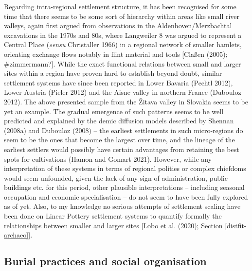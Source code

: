 \documentclass[
  12pt,
  a4paper, twoside]{book}
\begin{document}
Regarding intra-regional settlement structure, it has been recognised for some time that there seems to be some sort of hierarchy within areas like small river valleys, again first argued from observations in the Aldenhoven/Merzbachtal excavations in the 1970s and 80s, where Langweiler 8 was argued to represent a Central Place (\emph{sensu} Christaller 1966) in a regional network of smaller hamlets, orienting exchange flows notably in flint material and tools {[}Claßen (2005); \#zimmermann?{]}. While the exact functional relations between small and larger sites within a region have proven hard to establish beyond doubt, similar settlement systems have since been reported in Lower Bavaria (Pechtl 2012), Lower Austria (Pieler 2012) and the Aisne valley in northern France (Dubouloz 2012). The above presented sample from the Žitava valley in Slovakia seems to be yet an example. The gradual emergence of such patterns seems to be well predicted and explained by the demic diffusion models described by Shennan (2008a) and Dubouloz (2008) -- the earliest settlements in such micro-regions do seem to be the ones that become the largest over time, and the lineage of the earliest settlers would possibly have certain advantages from retaining the best spots for cultivations (Hamon and Gomart 2021). However, while any interpretation of these systems in terms of regional polities or complex chiefdoms would seem unfounded, given the lack of any sign of administration, public buildings etc. for this period, other plausible interpretations -- including seasonal occupation and economic specialisation -- do not seem to have been fully explored as of yet. Also, to my knowledge no serious attempts of settlement scaling have been done on Linear Pottery settlement systems to quantify formally the relationships between smaller and larger sites {[}Lobo et al. (2020); Section \ref{distfit-archaeo}{]}.

\hypertarget{burial-practices-and-social-organisation}{%
\subsection{Burial practices and social organisation}\label{burial-practices-and-social-organisation}}
\end{document}

